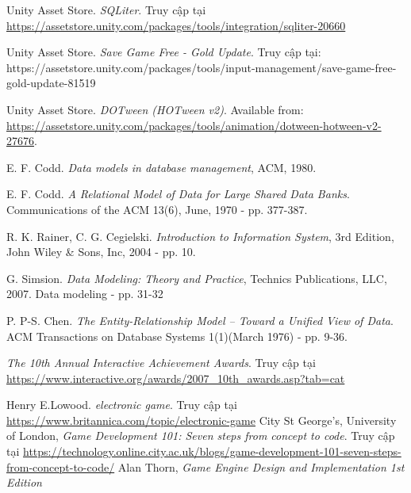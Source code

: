 \begin{thebibliography}{1}
	 Unity Asset Store. \textit{SQLiter}. Truy cập tại \url{https://assetstore.unity.com/packages/tools/integration/sqliter-20660}

	
	Unity Asset Store. \textit{Save Game Free - Gold Update}. Truy cập tại: https://assetstore.unity.com/packages/tools/input-management/save-game-free-gold-update-81519
	
	Unity Asset Store. \textit{DOTween (HOTween v2)}. Available from: \url{https://assetstore.unity.com/packages/tools/animation/dotween-hotween-v2-27676}.
	
	 E. F. Codd. \textit{Data models in database management}, ACM, 1980. 
	
	 E. F. Codd. \textit{A Relational Model of Data for Large Shared Data Banks}. Communications of the ACM 13(6), June, 1970 - pp. 377-387.
	
	 R. K. Rainer, C. G. Cegielski. \textit{Introduction to Information System}, 3rd Edition, John Wiley \& Sons, Inc, 2004 - pp. 10.
	
	G. Simsion. \textit{Data Modeling: Theory and Practice}, Technics Publications, LLC, 2007. 
	Data modeling - pp. 31-32
	
	 P. P-S. Chen. \textit{The Entity-Relationship Model – Toward a Unified View of 
		Data}. ACM Transactions on Database Systems 1(1)(March 1976) - pp. 9-36. 
	
	 \textit {The 10th Annual Interactive Achievement Awards}. Truy cập tại \url{https://www.interactive.org/awards/2007_10th_awards.asp?tab=cat}
	
	 Henry E.Lowood. \textit{electronic game}. Truy cập tại \url{https://www.britannica.com/topic/electronic-game}
	 City St George’s, University of London, \textit{Game Development 101: Seven steps from concept to code}. Truy cập tại \url{https://technology.online.city.ac.uk/blogs/game-development-101-seven-steps-from-concept-to-code/}
	 Alan Thorn, \textit{Game Engine Design and Implementation 1st Edition}
\end{thebibliography}